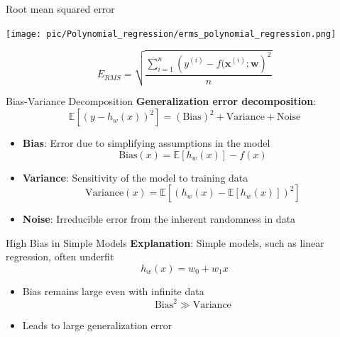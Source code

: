 \documentclass[serif, aspectratio=169]{beamer}
\begin{document}
\begin{frame}{Root mean squared error}
    \begin{minipage}{0.45\textwidth}
        \centering
        \texttt{[image: pic/Polynomial\_regression/erms\_polynomial\_regression.png]}
    \end{minipage}%
    \begin{minipage}{0.45\textwidth}
        \[
        E_{RMS} = \sqrt{\dfrac{\sum_{i=1}^n \left( y^{(i)} - f(\mathbf{x}^{(i)}; \mathbf{w} \right)^2}{n}}
        \]
    \end{minipage}
    \vfill
\end{frame}

\begin{frame}{Bias-Variance Decomposition}
    \textbf{Generalization error decomposition}:
    \[
    \mathbb{E}[(y - h_w(x))^2] = (\text{Bias})^2 + \text{Variance} + \text{Noise}
    \]
    \begin{itemize}
        \item \textbf{Bias}: Error due to simplifying assumptions in the model
        \[
        \text{Bias}(x) = \mathbb{E}[h_w(x)] - f(x)
        \]
        \item \textbf{Variance}: Sensitivity of the model to training data
        \[
        \text{Variance}(x) = \mathbb{E}[(h_w(x) - \mathbb{E}[h_w(x)])^2]
        \]
        \item \textbf{Noise}: Irreducible error from the inherent randomness in data
    \end{itemize}
\end{frame}

\begin{frame}{High Bias in Simple Models}
    \textbf{Explanation}: Simple models, such as linear regression, often underfit
    \[
    h_w(x) = w_0 + w_1 x
    \]
    \begin{itemize}
        \item Bias remains large even with infinite data
        \[
        \text{Bias}^2 \gg \text{Variance}
        \]
        \item Leads to large generalization error
    \end{itemize}
\end{frame}
\end{document}
